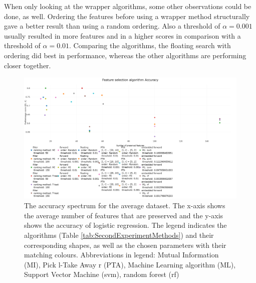 	When only looking at the wrapper algorithms, some other observations could be done, as well. Ordering the features before using a wrapper method structurally gave a better result than using a random ordering. Also a threshold of $\alpha = 0.001$ usually resulted in more features and in a higher scores in comparison with a threshold of $\alpha = 0.01$. Comparing the algorithms, the floating search with ordering did best in performance, whereas the other algorithms are performing closer together.
	
	\begin{figure}[H]
		\centering
		\includegraphics[angle=90,height=1.4\textwidth]{Accuracy_new.png}
		\caption{The accuracy spectrum for the average dataset. The x-axis shows the average number of features that are preserved and the y-axis shows the accuracy of logistic regression. The legend indicates the algorithms (Table \ref{tab:SecondExperimentMethods}) and their corresponding shapes, as well as the chosen parameters with their matching colours. Abbreviations in legend: Mutual Information (MI), Pick l-Take Away r (PTA), Machine Learning algorithm (ML), Support Vector Machine (svm), random forest (rf)}
		\label{fig:Avg_Accuracy_Spectrum}
	\end{figure}

